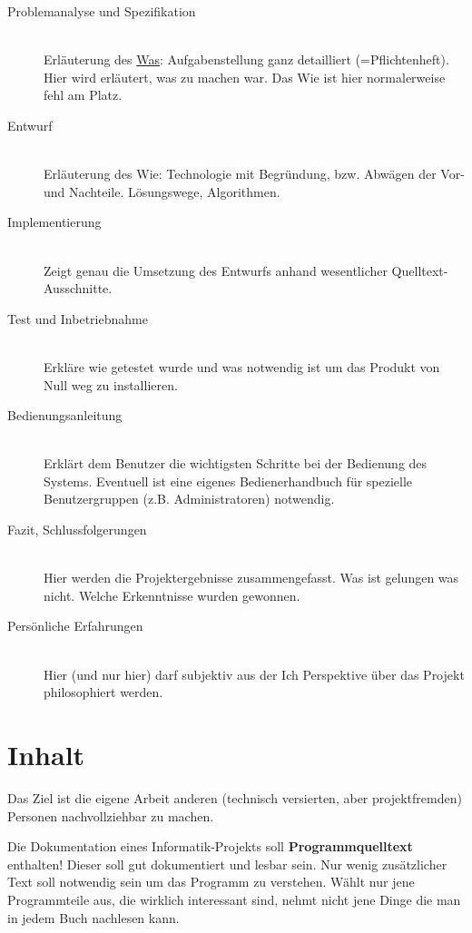 \begin{description}
\item[Problemanalyse und Spezifikation]
\ \\Erläuterung des \underline{Was}: Aufgabenstellung ganz detailliert (=Pflichtenheft). Hier wird erläutert, was zu machen war. Das Wie ist hier normalerweise fehl am Platz.
\item[Entwurf]
\ \\Erläuterung des Wie: Technologie mit Begründung, bzw. Abwägen der Vor- und Nachteile. Lösungswege, Algorithmen.
\item[Implementierung]
\ \\Zeigt genau die Umsetzung des Entwurfs anhand wesentlicher Quelltext-Ausschnitte.
\item[Test und Inbetriebnahme]
\ \\Erkläre wie getestet wurde und was notwendig ist um das Produkt von Null weg zu installieren.
\item[Bedienungsanleitung]
\ \\Erklärt dem Benutzer die wichtigsten Schritte bei der Bedienung des Systems.
Eventuell ist eine eigenes Bedienerhandbuch für spezielle Benutzergruppen (z.B. Administratoren) notwendig.
\item[Fazit, Schlussfolgerungen]
\ \\Hier werden die Projektergebnisse zusammengefasst. Was ist gelungen was nicht. Welche Erkenntnisse wurden gewonnen.
\item[Persönliche Erfahrungen]
\ \\Hier (und nur hier) darf subjektiv aus der Ich Perspektive über das Projekt philosophiert werden.
\end{description}


\section{Inhalt}

Das Ziel ist die eigene Arbeit anderen (technisch versierten, aber projektfremden) Personen nachvollziehbar zu machen.

Die Dokumentation eines Informatik-Projekts soll \textbf{Programmquelltext} enthalten!
Dieser soll gut dokumentiert und lesbar sein. 
Nur wenig zusätzlicher Text soll notwendig sein um das Programm zu verstehen.
Wählt nur jene Programmteile aus, die wirklich interessant sind, nehmt nicht jene Dinge die man in jedem Buch nachlesen kann.

